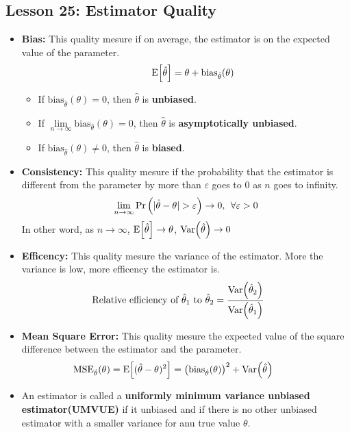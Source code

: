 \documentclass[10pt, french]{article}
\begin{document}
\begin{multicols*}{3}
\section*{Lesson 25: Estimator Quality}
\begin{itemize}[align=left,leftmargin=*]
    \item \textbf{Bias:} This quality mesure if on average, the estimator is on the expected value of the parameter. \[\hspace*{.5cm} \mathrm{E} {\left[ \hat{\theta} \right]} = \theta + \mathrm{bias}_{\hat{\theta}}(\theta) \]
    \begin{itemize}
        \item If $\mathrm{bias}_{\hat{\theta}}(\theta) = 0$, then $\hat{\theta}$ is \textbf{unbiased}.
        \item If $\lim\limits_{n\to \infty} \mathrm{bias}_{\hat{\theta}}(\theta) = 0$, then $\hat{\theta}$ is \textbf{asymptotically unbiased}.
        \item If $\mathrm{bias}_{\hat{\theta}}(\theta) \neq 0$, then $\hat{\theta}$ is \textbf{biased}.
    \end{itemize}
    \item \textbf{Consistency:} This quality mesure if the probability that the estimator is different from the parameter by more than $\varepsilon$ goes to $0$ as $n$ goes to infinity. \[ \lim_{n\to \infty} \prob{|\hat{\theta} - \theta|>\varepsilon} \to 0,\:\: \forall \varepsilon>0 \] In other word, as $n\to \infty$, $\mathrm{E} {\left[ \hat{\theta} \right]}\to \theta$, $\mathrm{Var} {\left( \hat{\theta} \right)}\to 0$
    \item \textbf{Efficency:} This quality mesure the variance of the estimator. More the variance is low, more efficency the estimator is. \[\hspace*{-.6cm} \text{Relative efficiency of $\hat{\theta}_1$ to $\hat{\theta}_2$} = \frac{\var{\hat{\theta}_2}}{\var{\hat{\theta}_1}} \]
    \item \textbf{Mean Square Error:} This quality mesure the expected value of the square difference between the estimator and the parameter.
    \begin{align*}
        \hspace*{-.6cm}
        \mathrm{MSE}_{\hat{\theta}}(\theta) &= \esp{(\hat{\theta} - \theta)^2} 
                                            = \left(\mathrm{bias}_{\hat{\theta}}(\theta)\right)^2 + \var{\hat{\theta}}
    \end{align*}
    \item An estimator is called a \textbf{uniformly minimum variance unbiased estimator(UMVUE)} if it unbiased and if there is no other unbiased estimator with a smaller variance for anu true value $\theta$.

\end{itemize}
\end{multicols*}
\end{document}
